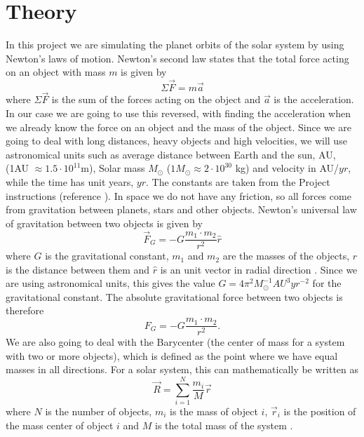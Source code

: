 \documentclass[norsk,a4paper,12pt]{article}
\begin{document}
\section{Theory}
In this project we are simulating the planet orbits of the solar system by using Newton's laws of motion. Newton's second law states that the total force acting on an object with mass $m$ is given by
\begin{equation}
\Sigma\vec{F}=m\vec{a}
\label{eq:N2L}
\end{equation}
where $\Sigma \vec{F}$ is the sum of the forces acting on the object and $\vec{a}$ is the acceleration. In our case we are going to use this reversed, with finding the acceleration when we already know the force on an object and the mass of the object. Since we are going to deal with long distances, heavy objects and high velocities, we will use astronomical units such as average distance between Earth and the sun, AU, (1AU $\approx1.5\cdot10^{11}$m), Solar mass $M_\odot$ ($1M_{\odot}\approx2\cdot10^{30}$ kg) and velocity in AU/$yr$, while the time has unit years, $yr$. The constants are taken from the Project instructions (reference \cite {Project_text}). In space we do not have any friction, so all forces come from gravitation between planets, stars and other objects. Newton's universal law of gravitation between two objects is given by
\begin{equation}
\vec{F}_G=-G\frac{m_1\cdot m_2}{r^2}\hat{r}
\label{eq:GravitationalForce}
\end{equation}
where $G$ is the gravitational constant, $m_1$ and $m_2$ are the masses of the objects, $r$ is the distance between them and $\hat{r}$ is an unit vector in radial direction \cite{Barycenter}. Since we are using astronomical units, this gives the value $G = 4\pi^2 M_{\odot} ^{-1} AU^3 yr^{-2}$ \cite{Project_text} for the gravitational constant.  The absolute gravitational force between two objects is therefore
\begin{equation}
F_G=-G\frac{m_1\cdot m_2}{r^2}.
\label{eq:absGravitationalForce}
\end{equation}
We are also going to deal with the Barycenter (the center of mass for a system with two or more objects), which is defined as the point where we have equal masses in all directions. For a solar system, this can mathematically be written as
\begin{equation}
\vec{R}=\sum_{i=1}^N \frac{m_i}{M}\vec{r}
\end{equation}
where $N$ is the number of objects, $m_i$ is the mass of object $i$, $\vec{r}_i$ is the position of the mass center of object $i$ and $M$ is the total mass of the system \cite{Barycenter}.\par\vspace{5mm}
\end{document}
